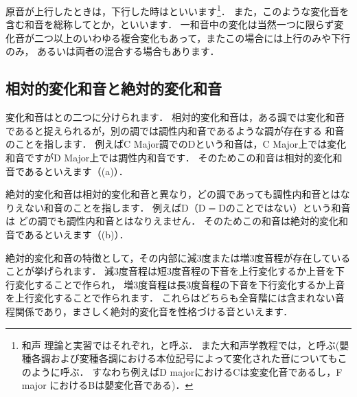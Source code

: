 \documentclass[dvipdfmx,uplatex,b5paper,openany,jbase=12Q,nomag*,textwidth-limit=44%
               ]{gachimuchi}
\begin{document}
原音が上行したときは，下行した時はといいます\footnote{%
和声 理論と実習ではそれぞれ，と呼ぶ．
また大和声学教程では，と呼ぶ(嬰種各調および変種各調における本位記号によって変化された音についてもこのように呼ぶ．
すなわち例えばD majorにおけるC\aNatural は変変化音であるし，F major におけるB\aNatural は嬰変化音である)．
}．
また，このような変化音を含む和音を総称してとか，といいます．
一和音中の変化は当然一つに限らず変化音が二つ以上のいわゆる複合変化もあって，またこの場合には上行のみや下行のみ，
あるいは両者の混合する場合もあります．

\subsection{相対的変化和音と絶対的変化和音}
変化和音はとの二つに分けられます．
相対的変化和音は，ある調では変化和音であると捉えられるが，別の調では調性内和音であるような調が存在する
和音のことを指します．
例えばC Major調でのDという和音は，C Major上では変化和音ですがD Major上では調性内和音です．
そのためこの和音は相対的変化和音であるといえます（(a)）．

絶対的変化和音は相対的変化和音と異なり，どの調であっても調性内和音とはなりえない和音のことを指します．
例えばD（D\Min{}$=$D\Dimt のことではない）という和音は
どの調でも調性内和音とはなりえません．
そのためこの和音は絶対的変化和音であるといえます（(b)）．
\begin{floatMusic}[width=0.6\linewidth]
  \nostartrule%
  \Startpiece
  \znotes\lcharsu{}\en
  \Notes%
  \zchordsl{\Gnii}%
  \en{}\changecontext%
  \Notes%
  \zchordsl{\Gni}%
  \en\setdoublebar{}\ignorenats\changecontext%
  \Notes%
  \en%
  \endpiece
\end{floatMusic}

絶対的変化和音の特徴として，その内部に減3度または増3度音程が存在していることが挙げられます．
減3度音程は短3度音程の下音を上行変化するか上音を下行変化することで作られ，
増3度音程は長3度音程の下音を下行変化するか上音を上行変化することで作られます．
これらはどちらも全音階には含まれない音程関係であり，まさしく絶対的変化音を性格づける音といえます．
\end{document}

